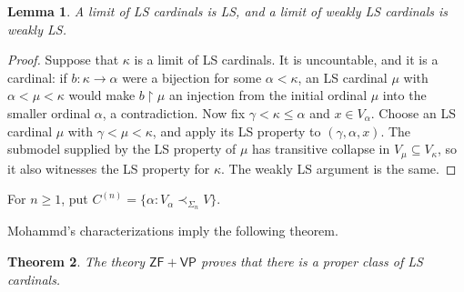 \documentclass[11pt,a4paper]{amsart}
\newif\ifrevisionblue
\DeclareRobustCommand{\revision}[1]{{\ifrevisionblue\color{blue}\fi#1}}
\newcommand{\VP}{\mathsf{VP}}
\newcommand{\ZF}{\mathsf{ZF}}
\newcommand{\restr}{\mathbin{\upharpoonright}}
\theoremstyle{plain}
\newtheorem{theorem}{Theorem}[section]
\newtheorem{lemma}[theorem]{Lemma}
\theoremstyle{definition}
\theoremstyle{remark}
\begin{document}
\begin{lemma}\label{lem:limits-LS}
A limit of LS cardinals is LS, and a limit of weakly LS cardinals is weakly LS.
\end{lemma}

\begin{proof}
\begingroup

Suppose that $\kappa$ is a limit of LS cardinals.  It is uncountable, and it is a cardinal: if $b:\kappa\to\alpha$ were a bijection for some $\alpha<\kappa$, an LS cardinal $\mu$ with $\alpha<\mu<\kappa$ would make $b\restr\mu$ an injection from the initial ordinal $\mu$ into the smaller ordinal $\alpha$, a contradiction.  Now fix $\gamma<\kappa\leq\alpha$ and $x\in V_\alpha$.  Choose an LS cardinal $\mu$ with $\gamma<\mu<\kappa$, and apply its LS property to $(\gamma,\alpha,x)$.  The submodel supplied by the LS property of $\mu$ has transitive collapse in $V_\mu\subseteq V_\kappa$, so it also witnesses the LS property for $\kappa$.  The weakly LS argument is the same.
\endgroup
\end{proof}

For $n\geq1$, put $C^{(n)}=\{\alpha:V_\alpha\prec_{\Sigma_n}V\}$.

\revision{Mohammd's characterizations \cite[Theorems~3.1 and~2.8]{Mohammd} imply the following theorem.}

\begin{theorem}\label{thm:Vopenka-LS}
The theory $\ZF+\VP$ proves that there is a proper class of LS cardinals.
\end{theorem}
\end{document}
